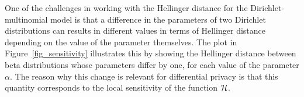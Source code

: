 \documentclass{article}
\begin{document}

One of the challenges in working with the Hellinger distance for the
Dirichlet-multinomial model is that a difference in the parameters of two
Dirichlet distributions can results in different values  in terms of Hellinger distance
depending on the value of the parameter
themselves. The plot in Figure~\ref{fig_sensitivity} illustrates
this by showing the Hellinger distance between beta distributions
whose parameters differ by one, for each value of the parameter
$\alpha$. The reason why this change is relevant
for differential privacy is that this quantity corresponds to the local
sensitivity of the function $\mathcal{H}$. 
\end{document}

